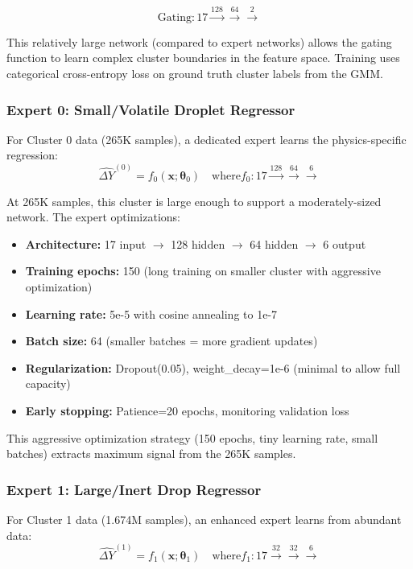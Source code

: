 \documentclass[letterpaper,twocolumn,10pt]{article}
\begin{document}
\begin{equation}
\text{Gating}: 17 \xrightarrow{128} \xrightarrow{64} \xrightarrow{2}
\end{equation}

This relatively large network (compared to expert networks) allows the gating function to learn complex cluster boundaries in the feature space. Training uses categorical cross-entropy loss on ground truth cluster labels from the GMM.

\subsubsection{Expert 0: Small/Volatile Droplet Regressor}

For Cluster 0 data (265K samples), a dedicated expert learns the physics-specific regression:
\begin{equation}
\hat{\Delta Y}^{(0)} = f_0(\mathbf{x}; \boldsymbol{\theta}_0) \quad \text{where} f_0: 17 \xrightarrow{128} \xrightarrow{64} \xrightarrow{6}
\end{equation}

At 265K samples, this cluster is large enough to support a moderately-sized network. The expert optimizations:
\begin{itemize}
    \item \textbf{Architecture:} 17 input $\to$ 128 hidden $\to$ 64 hidden $\to$ 6 output
    \item \textbf{Training epochs:} 150 (long training on smaller cluster with aggressive optimization)
    \item \textbf{Learning rate:} 5e-5 with cosine annealing to 1e-7
    \item \textbf{Batch size:} 64 (smaller batches = more gradient updates)
    \item \textbf{Regularization:} Dropout(0.05), weight\_decay=1e-6 (minimal to allow full capacity)
    \item \textbf{Early stopping:} Patience=20 epochs, monitoring validation loss
\end{itemize}

This aggressive optimization strategy (150 epochs, tiny learning rate, small batches) extracts maximum signal from the 265K samples.

\subsubsection{Expert 1: Large/Inert Drop Regressor}

For Cluster 1 data (1.674M samples), an enhanced expert learns from abundant data:
\begin{equation}
\hat{\Delta Y}^{(1)} = f_1(\mathbf{x}; \boldsymbol{\theta}_1) \quad \text{where} f_1: 17 \xrightarrow{32} \xrightarrow{32} \xrightarrow{6}
\end{equation}
\end{document}
